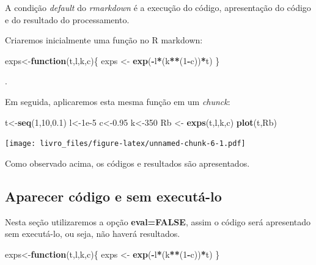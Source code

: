 \documentclass[]{book}
\newenvironment{Shaded}{\begin{snugshade}}{\end{snugshade}}
\newcommand{\KeywordTok}[1]{\textcolor[rgb]{0.13,0.29,0.53}{\textbf{#1}}}
\newcommand{\DecValTok}[1]{\textcolor[rgb]{0.00,0.00,0.81}{#1}}
\newcommand{\FloatTok}[1]{\textcolor[rgb]{0.00,0.00,0.81}{#1}}
\newcommand{\StringTok}[1]{\textcolor[rgb]{0.31,0.60,0.02}{#1}}
\newcommand{\ControlFlowTok}[1]{\textcolor[rgb]{0.13,0.29,0.53}{\textbf{#1}}}
\newcommand{\OperatorTok}[1]{\textcolor[rgb]{0.81,0.36,0.00}{\textbf{#1}}}
\newcommand{\NormalTok}[1]{#1}
\begin{document}
A condição \emph{default} do \emph{rmarkdown} é a execução do código,
apresentação do código e do resultado do processamento.

Criaremos inicialmente uma função no R markdown:

\begin{Shaded}
\begin{Highlighting}[]
\NormalTok{exps<-}\ControlFlowTok{function}\NormalTok{(t,l,k,c)\{}
\NormalTok{ exps <-}\StringTok{ }\KeywordTok{exp}\NormalTok{(}\OperatorTok{-}\NormalTok{l}\OperatorTok{*}\NormalTok{(k}\OperatorTok{**}\NormalTok{(}\DecValTok{1}\OperatorTok{-}\NormalTok{c))}\OperatorTok{*}\NormalTok{t)}
\NormalTok{\}}
\end{Highlighting}
\end{Shaded}

.

Em seguida, aplicaremos esta mesma função em um \emph{chunck}:

\begin{Shaded}
\begin{Highlighting}[]
\NormalTok{t<-}\KeywordTok{seq}\NormalTok{(}\DecValTok{1}\NormalTok{,}\DecValTok{10}\NormalTok{,}\FloatTok{0.1}\NormalTok{)}
\NormalTok{l<-}\FloatTok{1e-5}
\NormalTok{c<-}\FloatTok{0.95}
\NormalTok{k<-}\DecValTok{350}
\NormalTok{Rb <-}\StringTok{ }\KeywordTok{exps}\NormalTok{(t,l,k,c)}
\KeywordTok{plot}\NormalTok{(t,Rb)}
\end{Highlighting}
\end{Shaded}

\texttt{[image: livro\_files/figure-latex/unnamed-chunk-6-1.pdf]}

Como observado acima, os códigos e resultados são apresentados.

\subsection{Aparecer código e sem
executá-lo}\label{aparecer-cuxf3digo-e-sem-executuxe1-lo}

Nesta seção utilizaremos a opção \textbf{eval=FALSE}, assim o código
será apresentado sem executá-lo, ou seja, não haverá resultados.

\begin{Shaded}
\begin{Highlighting}[]
\NormalTok{exps<-}\ControlFlowTok{function}\NormalTok{(t,l,k,c)\{}
\NormalTok{ exps <-}\StringTok{ }\KeywordTok{exp}\NormalTok{(}\OperatorTok{-}\NormalTok{l}\OperatorTok{*}\NormalTok{(k}\OperatorTok{**}\NormalTok{(}\DecValTok{1}\OperatorTok{-}\NormalTok{c))}\OperatorTok{*}\NormalTok{t)}
\NormalTok{\}}
\end{Highlighting}
\end{Shaded}
\end{document}
